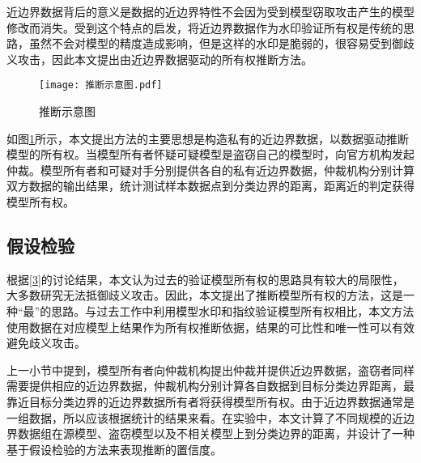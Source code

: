 近边界数据背后的意义是数据的近边界特性不会因为受到模型窃取攻击产生的模型修改而消失。受到这个特点的启发，将近边界数据作为水印验证所有权是传统的思路，虽然不会对模型的精度造成影响，但是这样的水印是脆弱的，很容易受到御歧义攻击，因此本文提出由近边界数据驱动的所有权推断方法。

\begin{figure}[htbp]%
	\centering
	\setlength{\abovecaptionskip}{5mm} %
	\texttt{[image: 推断示意图.pdf]}
	\caption{推断示意图}
	\label{推断示意图}
	\end {figure}

如图\ref{推断示意图}所示，本文提出方法的主要思想是构造私有的近边界数据，以数据驱动推断模型的所有权。当模型所有者怀疑可疑模型是盗窃自己的模型时，向官方机构发起仲裁。模型所有者和可疑对手分别提供各自的私有近边界数据，仲裁机构分别计算双方数据的输出结果，统计测试样本数据点到分类边界的距离，距离近的判定获得模型所有权。


\subsection{假设检验}\label{3.3.3}

根据\ref{3}的讨论结果，本文认为过去的验证模型所有权的思路具有较大的局限性，大多数研究无法抵御歧义攻击。因此，本文提出了推断模型所有权的方法，这是一种“最”的思路。与过去工作中利用模型水印和指纹验证模型所有权相比，本文方法使用数据在对应模型上结果作为所有权推断依据，结果的可比性和唯一性可以有效避免歧义攻击。

上一小节中提到，模型所有者向仲裁机构提出仲裁并提供近边界数据，盗窃者同样需要提供相应的近边界数据，仲裁机构分别计算各自数据到目标分类边界距离，最靠近目标分类边界的近边界数据所有者将获得模型所有权。由于近边界数据通常是一组数据，所以应该根据统计的结果来看。在实验中，本文计算了不同规模的近边界数据组在源模型、盗窃模型以及不相关模型上到分类边界的距离，并设计了一种基于假设检验的方法来表现推断的置信度。

